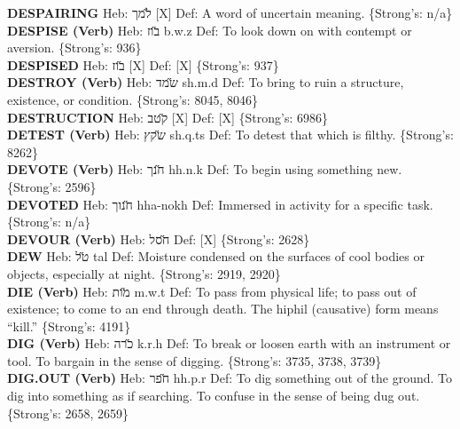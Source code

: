 {\textbf{DESPAIRING} Heb: {\large\H למך} {[}X{]} Def: A word of uncertain meaning. \{Strong's: n/a\}\hfill{}\\

\textbf{DESPISE (Verb)} Heb: {\large\H בוז} b.w.z Def: To look down on with contempt or aversion. \{Strong's: 936\}\hfill{}\\

\textbf{DESPISED} Heb: {\large\H בוז} {[}X{]} Def: {[}X{]} \{Strong's: 937\}\hfill{}\\

\textbf{DESTROY (Verb)} Heb: {\large\H שמד} sh.m.d Def: To bring to ruin a structure, existence, or condition. \{Strong's: 8045, 8046\}\hfill{}\\

\textbf{DESTRUCTION} Heb: {\large\H קטב} {[}X{]} Def: {[}X{]} \{Strong's: 6986\}\hfill{}\\

\textbf{DETEST (Verb)} Heb: {\large\H שקץ} sh.q.ts Def: To detest that which is filthy. \{Strong's: 8262\}\hfill{}\\

\textbf{DEVOTE (Verb)} Heb: {\large\H חנך} hh.n.k Def: To begin using something new. \{Strong's: 2596\}\hfill{}\\

\textbf{DEVOTED} Heb: {\large\H חנוך} hha-nokh Def: Immersed in activity for a specific task. \{Strong's: n/a\}\hfill{}\\

\textbf{DEVOUR (Verb)} Heb: {\large\H חסל} Def: {[}X{]} \{Strong's: 2628\}\hfill{}\\

\textbf{DEW} Heb: {\large\H טל} tal Def: Moisture condensed on the surfaces of cool bodies or objects, especially at night. \{Strong's: 2919, 2920\}\hfill{}\\

\textbf{DIE (Verb)} Heb: {\large\H מות} m.w.t Def: To pass from physical life; to pass out of existence; to come to an end through death. The hiphil (causative) form means ``kill.'' \{Strong's: 4191\}\hfill{}\\

\textbf{DIG (Verb)} Heb: {\large\H כרה} k.r.h Def: To break or loosen earth with an instrument or tool. To bargain in the sense of digging. \{Strong's: 3735, 3738, 3739\}\hfill{}\\

\textbf{DIG.OUT (Verb)} Heb: {\large\H חפר} hh.p.r Def: To dig something out of the ground. To dig into something as if searching. To confuse in the sense of being dug out. \{Strong's: 2658, 2659\}\hfill{}\\

}
